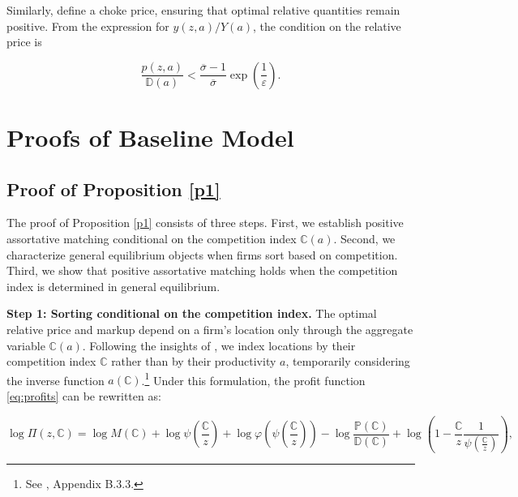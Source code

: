Similarly, \textcite{Klenow&Willis16} define a choke price, ensuring that optimal relative quantities remain positive. From the expression for $y(z,a)/Y(a)$, the condition on the relative price is  

\begin{equation*}
	\frac{p(z,a)}{\mathbb{D}(a)} < \frac{\overline{\sigma} - 1}{\overline{\sigma}}\exp\left(\frac{1}{\varepsilon}\right).
\end{equation*}	


\newpage
\section{Proofs of Baseline Model}\label{a:proofs}

\subsection{Proof of Proposition \ref{p1}}\label{a:sorting}  
The proof of Proposition \ref{p1} consists of three steps. First, we establish positive assortative matching conditional on the competition index $\mathbb{C}(a)$. Second, we characterize general equilibrium objects when firms sort based on competition. Third, we show that positive assortative matching holds when the competition index is determined in general equilibrium.  

\noindent \textbf{Step 1: Sorting conditional on the competition index.}  
The optimal relative price and markup depend on a firm’s location only through the aggregate variable $\mathbb{C}(a)$. Following the insights of \textcite{Bilal23}, we index locations by their competition index $\mathbb{C}$ rather than by their productivity $a$, temporarily considering the inverse function $a(\mathbb{C})$.\footnote{See \textcite{Bilal23}, Appendix B.3.3.} Under this formulation, the profit function \eqref{eq:profits} can be rewritten as:  

\vspace{-0.3cm}
\begin{equation}\label{eq:intlocp}
	\log \Pi(z,\mathbb{C}) =  \log M({\mathbb{C}}) +  \log \psi\left(\frac{{\mathbb{C}}}{z}\right) + \log \varphi\left(\psi\left(\frac{{\mathbb{C}}}{z}\right)\right) - \log\frac{\mathbb{P}({\mathbb{C}})}{\mathbb{D}({\mathbb{C}})} + \log \left(1 - \frac{{\mathbb{C}}}{z} \frac{1}{\psi\left(\frac{{\mathbb{C}}}{z}\right)} \right),
\end{equation}  

